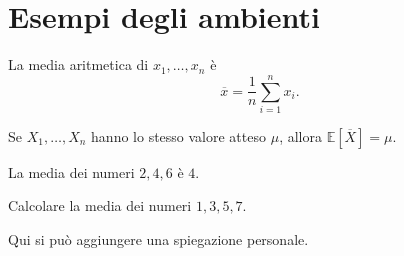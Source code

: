 \section{Esempi degli ambienti}

\begin{definizione}
La media aritmetica di $x_1,\ldots,x_n$ è
\[\overline{x}=\frac{1}{n}\sum_{i=1}^n x_i.\]
\end{definizione}

\begin{teorema}
Se $X_1,\ldots,X_n$ hanno lo stesso valore atteso $\mu$,
allora $\mathbb{E}[\overline{X}]=\mu$.
\end{teorema}

\begin{esempio}
La media dei numeri $2,4,6$ è $4$.
\end{esempio}

\begin{esercizio}
Calcolare la media dei numeri $1,3,5,7$.
\end{esercizio}

\begin{approfondimento}
Qui si può aggiungere una spiegazione personale.
\end{approfondimento}

\fineapprofondimento
\finelezione
